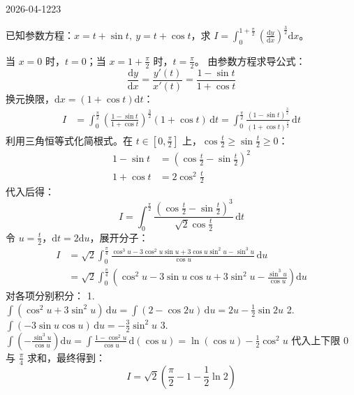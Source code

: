 \begin{mistake}{2026-04-12}{23}

\begin{problemcontent}
已知参数方程：\( x=t+\sin t,\ y=t+\cos t \)，求 \( \displaystyle I=\int_{0}^{1+\frac{\pi}{2}}\left(\frac{\mathrm{d}y}{\mathrm{d}x}\right)^{\frac{3}{2}}\mathrm{d}x \)。
\end{problemcontent}

\begin{solutioncontent}
当 \(x=0\) 时，\(t=0\)；当 \(x=1+\frac{\pi}{2}\) 时，\(t=\frac{\pi}{2}\)。
由参数方程求导公式：
\[
\frac{\mathrm{d}y}{\mathrm{d}x} = \frac{y'(t)}{x'(t)} = \frac{1-\sin t}{1+\cos t}
\]
换元换限，\(\mathrm{d}x = (1+\cos t)\mathrm{d}t\)：
\[
\begin{aligned}
I &= \int_{0}^{\frac{\pi}{2}} \left( \frac{1-\sin t}{1+\cos t} \right)^{\frac{3}{2}} (1+\cos t) \,\mathrm{d}t = \int_{0}^{\frac{\pi}{2}} \frac{(1-\sin t)^{\frac{3}{2}}}{(1+\cos t)^{\frac{1}{2}}} \,\mathrm{d}t
\end{aligned}
\]
利用三角恒等式化简根式。在 \(t \in [0, \frac{\pi}{2}]\) 上，\(\cos\frac{t}{2} \ge \sin\frac{t}{2} \ge 0\)：
\[
\begin{aligned}
1-\sin t &= \left(\cos\frac{t}{2} - \sin\frac{t}{2}\right)^2 \\
1+\cos t &= 2\cos^2\frac{t}{2}
\end{aligned}
\]
代入后得：
\[
I = \int_{0}^{\frac{\pi}{2}} \frac{\left(\cos\frac{t}{2} - \sin\frac{t}{2}\right)^3}{\sqrt{2}\cos\frac{t}{2}} \,\mathrm{d}t
\]
令 \(u = \frac{t}{2}\)，\(\mathrm{d}t = 2\mathrm{d}u\)，展开分子：
\[
\begin{aligned}
I &= \sqrt{2} \int_{0}^{\frac{\pi}{4}} \frac{\cos^3 u - 3\cos^2 u\sin u + 3\cos u\sin^2 u - \sin^3 u}{\cos u} \,\mathrm{d}u \\
  &= \sqrt{2} \int_{0}^{\frac{\pi}{4}} \left( \cos^2 u - 3\sin u\cos u + 3\sin^2 u - \frac{\sin^3 u}{\cos u} \right) \mathrm{d}u
\end{aligned}
\]
对各项分别积分：
1. \(\int (\cos^2 u + 3\sin^2 u)\,\mathrm{d}u = \int (2-\cos 2u)\,\mathrm{d}u = 2u - \frac{1}{2}\sin 2u\)
2. \(\int (-3\sin u\cos u)\,\mathrm{d}u = -\frac{3}{2}\sin^2 u\)
3. \(\int \left(-\frac{\sin^3 u}{\cos u}\right)\mathrm{d}u = \int \frac{1-\cos^2 u}{\cos u}\,\mathrm{d}(\cos u) = \ln(\cos u) - \frac{1}{2}\cos^2 u\)
代入上下限 \(0\) 与 \(\frac{\pi}{4}\) 求和，最终得到：
\[
I = \sqrt{2}\left(\frac{\pi}{2} - 1 - \frac{1}{2}\ln 2\right)
\]
\end{solutioncontent}


\end{mistake}
